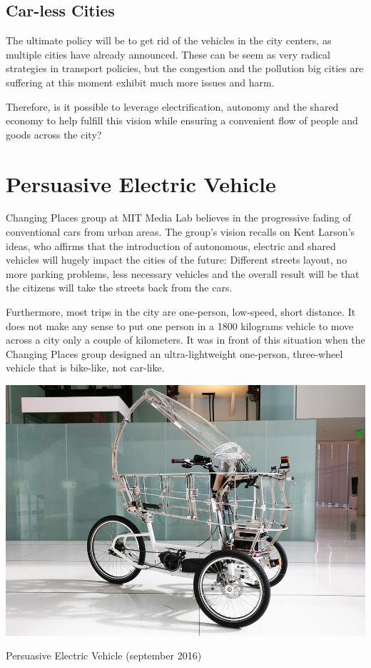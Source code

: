 \subsection{Car-less Cities}

The ultimate policy will be to get rid of the vehicles in the city centers, as multiple cities have already announced.\cite{carFree} These can be seem as very radical strategies in transport policies, but the congestion and the pollution big cities are suffering at this moment exhibit much more issues and harm.

Therefore, is it possible to leverage electrification, autonomy and the shared economy to help fulfill this vision while ensuring a convenient flow of people and goods across the city?

\section{Persuasive Electric Vehicle}
Changing Places group\cite{cp} at MIT Media Lab\cite{ml} believes in the progressive fading of conventional cars from urban areas. The group's vision recalls on Kent Larson's\cite{kll} ideas, who affirms that the introduction of autonomous, electric and shared vehicles will hugely impact the cities of the future: Different streets layout, no more parking problems, less necessary vehicles and the overall result will be that the citizens will take the streets back from the cars. 

Furthermore, most trips in the city are one-person, low-speed, short distance. It does not make any sense to put one person in a 1800 kilograms vehicle to move across a city only a couple of kilometers. It was in front of this situation when the Changing Places group designed an ultra-lightweight one-person, three-wheel vehicle that is bike-like, not car-like.

\begin{marginfigure}
	\includegraphics[width=\linewidth]{figs/01/pev_4}
	\caption{Persuasive Electric Vehicle (september 2016)}
\end{marginfigure}


